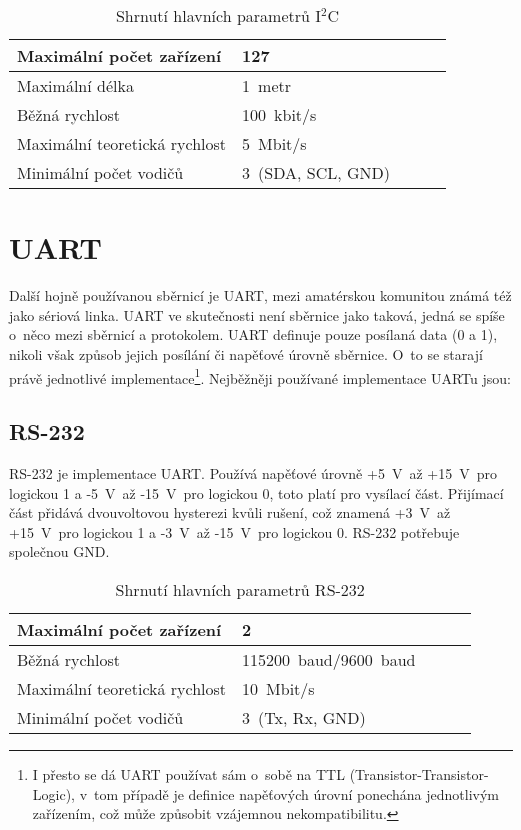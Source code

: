 \begin{table}[h]
	
	\centering
	\begin{tabular}{|l|l|l|l|l|} \hline
		Maximální počet zařízení      & 127              \\ \hline
		Maximální délka               & 1~metr           \\ \hline
		Běžná rychlost                & 100~kbit/s        \\ \hline
		Maximální teoretická rychlost & 5~Mbit/s          \\ \hline
		Minimální počet vodičů        & 3~(SDA, SCL, GND) \\ \hline
	\end{tabular}
	\caption{Shrnutí hlavních parametrů I$^{2}$C}
\end{table}



\section{UART}
Další hojně používanou sběrnicí je UART, mezi amatérskou komunitou známá též jako sériová linka.
UART ve skutečnosti není sběrnice jako taková, jedná se spíše o~něco mezi sběrnicí a protokolem.
UART definuje pouze posílaná data (0 a 1), nikoli však způsob jejich posílání či napěťové úrovně sběrnice.
O~to se starají právě jednotlivé implementace\footnote{I přesto se dá UART používat sám o~sobě na TTL (Transistor-Transistor-Logic), v~tom případě je definice napěťových úrovní ponechána jednotlivým zařízením, což může způsobit vzájemnou nekompatibilitu.}.
Nejběžněji používané implementace UARTu jsou:
\subsection{RS-232} %
RS-232 \cite{RS-232} je implementace UART.
Používá napěťové úrovně +5~V~až +15~V~pro logickou 1 a -5~V~až -15~V~pro logickou 0, toto platí pro vysílací část.
Přijímací část přidává dvouvoltovou hysterezi kvůli rušení, což znamená +3~V~až +15~V~pro logickou 1 a -3~V~až -15~V~pro logickou 0.
RS-232 potřebuje společnou GND.
\begin{table}[h]
	
	\centering
	\begin{tabular}{|l|l|l|l|l|} \hline
		Maximální počet zařízení      & 2              \\ \hline
		Běžná rychlost                & 115200~baud/9600~baud        \\ \hline
		Maximální teoretická rychlost & 10~Mbit/s       \\ \hline
		Minimální počet vodičů        & 3~(Tx, Rx, GND) \\ \hline
	\end{tabular}
	\caption{Shrnutí hlavních parametrů RS-232}
\end{table}
